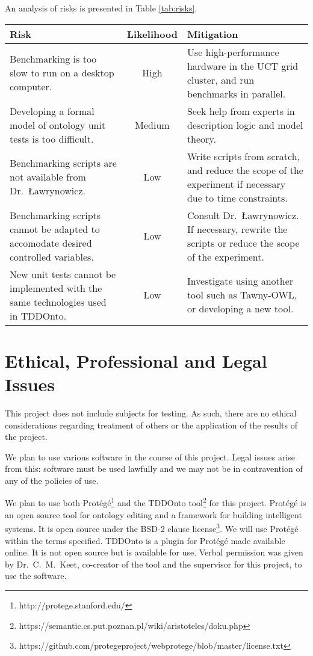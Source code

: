 \documentclass[draft]{sig-alternate}
\begin{document}
An analysis of risks is presented in Table \ref{tab:risks}.

\begin{table*}
  \caption{Analysis of risks}
  \label{tab:risks}
  \vspace{6pt}
  \setlength{\extrarowheight}{4pt}
  \begin{tabularx}{\textwidth}{XcX}
    Risk & Likelihood & Mitigation \\ \hline
    Benchmarking is too slow to run on a desktop computer. &
    High &
    Use high-performance hardware in the UCT grid cluster, and run benchmarks in parallel. \\
    Developing a formal model of ontology unit tests is too difficult. &
    Medium &
    Seek help from experts in description logic and model theory. \\
    Benchmarking scripts are not available from Dr.\ {\L}awrynowicz. &
    Low &
    Write scripts from scratch, and reduce the scope of the experiment if necessary due to time constraints. \\
    Benchmarking scripts cannot be adapted to accomodate desired controlled variables. &
    Low &
    Consult Dr.\ {\L}awrynowicz.  If necessary, rewrite the scripts or reduce the scope of the experiment. \\
    New unit tests cannot be implemented with the same technologies used in TDDOnto. &
    Low &
    Investigate using another tool such as Tawny-OWL, or developing a new tool.
  \end{tabularx}
\end{table*}

\section{Ethical, Professional and Legal Issues}

This project does not include subjects for testing. As such, there are no ethical considerations regarding treatment of others or the application of the results of the project.

We plan to use various software in the course of this project. Legal issues arise from this: software must be used lawfully and we may not be in contravention of any of the policies of use.

We plan to use both Prot\'eg\'e\footnote{http://protege.stanford.edu/} and the TDDOnto tool\footnote{https://semantic.cs.put.poznan.pl/wiki/aristoteles/doku.php} for this project. Prot\'eg\'e is an open source tool for ontology editing and a framework for building intelligent systems. It is open source under the BSD-2 clause license\footnote{https://github.com/protegeproject/webprotege/blob/master/license.txt}. We will use Prot\'eg\'e within the terms specified. TDDOnto is a plugin for Prot\'eg\'e made available online. It is not open source but is available for use. Verbal permission was given by Dr.\ C.\ M.\ Keet, co-creator of the tool and the supervisor for this project, to use the software.
\end{document}
